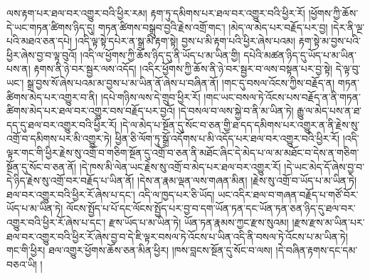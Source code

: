 ལས་རྟག་པར་ཐལ་བར་འགྱུར་བའི་ཕྱིར་རམ། རྟག་ཏུ་དམིགས་པར་ཐལ་བར་འགྱུར་བའི་ཕྱིར་རོ། །ཕྱོགས་ཀྱི་ཆོས་དེ་ཡང་གཏན་ཚིགས་ཉིད་དུ། གཏན་ཚིགས་བསྒྲུབ་བྱའི་རྗེས་འགྲོ་གང་། །མེད་ལ་མེད་པར་བརྗོད་པར་བྱ། །དེར་ནི་ལྔ་པའི་མཐའ་ཅན་དཔེ། །འདི་ལྟ་སྟེ་དཔེར་ན་སྒྲ་མི་རྟག་སྟེ། བྱས་པ་མི་རྟག་པའི་ཕྱིར་ཞེས་པའམ། རྟག་སྟེ་མ་བྱས་པའི་ཕྱིར་ཞེས་བྱ་བ་ལྟ་བུའོ། །འདི་ལ་ཕྱོགས་ཀྱི་ཆོས་ཉིད་དུ་ནི་ཡོད་པ་མ་ཡིན་གྱི། དཔེའི་མཚན་ཉིད་དུ་ཡོད་པ་མ་ཡིན་པས་ན། རྟགས་ནི་ཉེ་བར་སྦྱར་ལས་འདོད། །འདིར་ཕྱོགས་ཀྱི་ཆོས་ནི་ཉེ་བར་སྦྱར་བ་ལས་བསྟན་པར་བྱ་སྟེ། དེ་ལྟ་བུ་ཡང་། སྒྲ་བྱས་སོ་ཞེས་པའམ་མ་བྱས་པ་མ་ཡིན་ནོ་ཞེས་པ་བཞིན་ནོ། །གང་དུ་བསལ་འོངས་ཀྱིས་བརྗོད་ན། གཏན་ཚིགས་མེད་པར་འགྱུར་བ་ནི། །དཔེ་གཉིས་ལས་དེ་གྲུབ་ཕྱིར་རོ། །གང་ཡང་བསལ་ཏེ་འོངས་པས་བརྗོད་ན་ནི་གཏན་ཚིགས་མེད་པར་ཐལ་བར་འགྱུར་བས་བརྗོད་པར་བྱའོ། །དེ་བསལ་བ་ལས་སྐྱེ་བ་ནི་མ་ཡིན་ཏེ། རྒྱུ་ལ་མེད་པས་ན་ཐ་དད་དུ་ཐལ་བར་འགྱུར་བའི་ཕྱིར་རོ། །དེ་ལ་མེད་པ་སྔོན་དུ་སོང་བ་ཅན་གྱི་ཐ་དད་དམིགས་པར་འགྱུར་ན་ནི་རྗེས་སུ་འགྲོ་བ་དམིགས་པར་མི་འགྱུར་ཏེ། ཕྱིན་ཅི་ལོག་ཏུ་སྒྲོ་འདོགས་པ་མི་འདོད་པར་ཐལ་བར་འགྱུར་བའི་ཕྱིར་རོ། །འདི་ལྟར་གང་གི་ཕྱིར་རྗེས་སུ་འགྲོ་བ་གཅིག་སྔོན་དུ་འགྲོ་བ་ཅན་ནི་མཐོང་ཞིང་དེ་མེད་པ་ལ་མ་མཐོང་བ་དེས་ན་གཅིག་སྔོན་དུ་སོང་བ་ཅན་ནོ། །དེ་ཁས་མི་ལེན་ཡང་རྗེས་སུ་འགྲོ་བ་མེད་པར་ཐལ་བར་འགྱུར་རོ། །དེ་ཡང་མེད་དོ་ཞེས་བྱ་བ་དེ་ཉིད་རྗེས་སུ་འགྲོ་བར་བརྗོད་པ་ཡིན་ནོ། །དེས་ན་རྣམ་ལྡན་ལས་གཞན་མིན། །རྗེས་སུ་འགྲོ་བ་ཡོད་པ་མ་ཡིན་ཏེ། ཐལ་བར་འགྱུར་བའི་ཕྱིར་རོ་ཞེས་པ་དང་། འདི་ལ་ཁྱད་པར་ཅི་ཡོད། ཡང་འདིར་ཐལ་བ་གཞན་བརྗོད་པ་གཙོ་བོར་ཡོད་པ་མ་ཡིན་ཏེ། ལོངས་སྤྱོད་པ་པོ་དང་ལོངས་སྤྱོད་པར་བྱ་བ་དག་ཡོན་ཏན་དང་ཡོན་ཏན་ཅན་ཉིད་དུ་ཐལ་བར་འགྱུར་བའི་ཕྱིར་རོ་ཞེས་པ་དང་། རྫས་ཡོད་པ་མ་ཡིན་ཏེ། ཡོན་ཏན་རྣམས་ཀྱང་རྫས་སུའམ། །རྫས་རྫས་མ་ཡིན་པར་ཐལ་བར་འགྱུར་བའི་ཕྱིར་རོ་ཞེས་བྱ་བ་དེ་ཇི་ལྟར་བསལ་ཏེ་འོངས་པ་ཡིན་འདི་ནི་བསལ་ཏེ་འོངས་པ་མ་ཡིན་ཏེ། གང་གི་ཕྱིར། ཐལ་འགྱུར་ཕྱོགས་ཆོས་ཅན་མིན་ཕྱིར། །ཁས་བླངས་སྔོན་དུ་སོང་བ་ལས། །དེ་བཞིན་རྟགས་དང་དམ་བཅའ་ཡི། །
